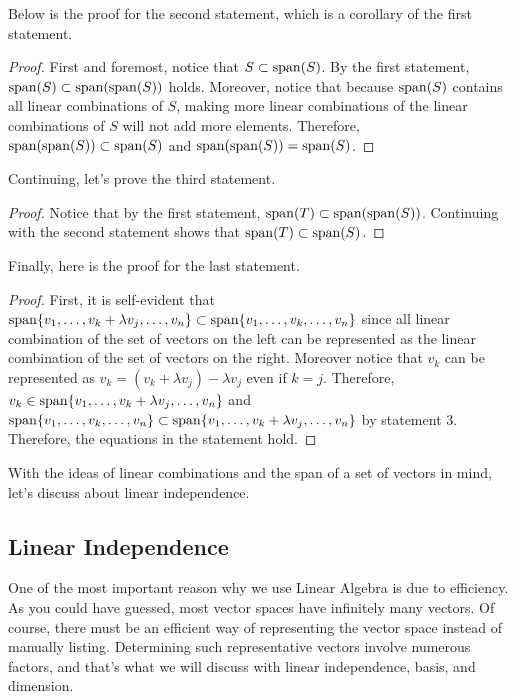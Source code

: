 \documentclass[../main.tex]{subfiles}
\begin{document}
Below is the proof for the second statement, which is a corollary
of the first statement.

\begin{proof}
First and foremost, notice that $S \subset \operatorname{span}(S)$. By the first
statement, $\operatorname{span}(S) \subset \operatorname{span}(\operatorname{span}(S))$ holds. Moreover,
notice that because $\operatorname{span}(S)$ contains all linear combinations of
$S$, making more linear combinations of the linear combinations of
$S$ will not add more elements. Therefore, $\operatorname{span}(\operatorname{span}(S)) \subset
\operatorname{span}(S)$ and $\operatorname{span}(\operatorname{span}(S)) = \operatorname{span}(S)$.
\end{proof}

Continuing, let's prove the third statement.

\begin{proof}
Notice that by the first statement, $\operatorname{span}(T) \subset
\operatorname{span}(\operatorname{span}(S))$. Continuing with the second statement shows that
$\operatorname{span}(T) \subset \operatorname{span}(S)$.
\end{proof}

Finally, here is the proof for the last statement.

\begin{proof}
First, it is self-evident that $\Span\{ v_1, \ldots, v_k
+ \lambda v_j, \ldots, v_n \} \subset \Span\{ v_1, \linebreak \ldots,
v_k, \ldots, v_n \}$ since all linear combination of the set of
vectors on the left can be represented as the linear combination of
the set of vectors on the right. Moreover notice that $v_k$ can be
represented as $v_k = (v_k + \lambda v_j) - \lambda v_j$ even if
$k = j$. Therefore, $v_k \in \operatorname{span}\{ v_1, \ldots, v_k + \lambda v_j,
\ldots, v_n \}$ and $\Span\{ v_1, \ldots, v_k, \ldots, v_n \} \subset
\Span\{ v_1, \ldots, v_k + \lambda v_j, \linebreak \ldots, v_n \}$ by
statement 3. Therefore, the equations in the statement hold.
\end{proof}

With the ideas of linear combinations and the span of a set of vectors
in mind, let's discuss about linear independence.

\subsection{Linear Independence}

One of the most important reason why we use Linear Algebra is due to
efficiency. As you could have guessed, most vector spaces have
infinitely many vectors. Of course, there must be an efficient way
of representing the vector space instead of manually listing.
Determining such representative vectors involve numerous factors,
and that's what we will discuss with linear independence, basis,
and dimension.
\end{document}

